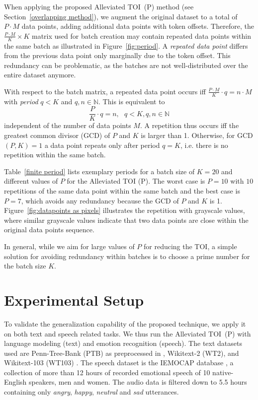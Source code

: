 \documentclass[11pt,a4paper]{article}
\begin{document}
When applying the proposed Alleviated TOI~(P) method (see Section~\ref{overlapping method}), we augment the original dataset to a total of $P \cdot M$ data points, adding additional data points with token offsets. Therefore, the $\frac{P \cdot M}{K} \times K$ matrix used for batch creation may contain repeated data points within the same batch as illustrated in Figure~\ref{fig:period}. A \textit{repeated data point} differs from the previous data point only marginally due to the token offset. This redundancy can be problematic, as the batches are not well-distributed over the entire dataset anymore.

With respect to the batch matrix, a repeated data point occurs iff $\frac{P \cdot M}{K} \cdot q = n \cdot M$ with \textit{period} $q < K$ and $q,n \in \mathbb{N}$. This is equivalent to
\[\frac{P}{K} \cdot q = n,\ \ \ q < K, q,n \in \mathbb{N}\]
independent of the number of data points $M$. A repetition thus occurs iff the greatest common divisor (GCD) of $P$ and $K$ is larger than 1. Otherwise, for GCD$(P,K) = 1$ a data point repeats only after period $q=K$, i.e. there is no repetition within the same batch.

Table~\ref{finite period} lists exemplary periods for a batch size of $K=20$ and different values of $P$ for the Alleviated TOI (P). The worst case is $P=10$ with $10$ repetitions of the same data point within the same batch and the best case is $P=7$, which avoids any redundancy because the GCD of $P$ and $K$ is 1. Figure~\ref{fig:datapoints as pixels} illustrates the repetition with grayscale values, where similar grayscale values indicate that two data points are close within the original data points sequence.

In general, while we aim for large values of $P$ for reducing the TOI, a simple solution for avoiding redundancy within batches is to choose a prime number for the batch size $K$.

\section{Experimental Setup}
\label{sec-exp}
To validate the generalization capability of the proposed technique, we apply it on both text and speech related tasks. We thus run the Alleviated TOI~(P) with language modeling (text) and emotion recognition (speech). The text datasets used are Penn-Tree-Bank (PTB) \cite{Marcus:1993} as preprocessed in \citet{Mikolov:11}, Wikitext-2 (WT2), and Wikitext-103 (WT103) \cite{Merity:16}.
The speech dataset is the IEMOCAP database \cite{Busso2008IEMOCAPIE}, a collection of more than 12 hours of recorded emotional speech of 10 native-English speakers, men and women. The audio data is filtered down to 5.5 hours containing only \textit{angry}, \textit{happy}, \textit{neutral} and \textit{sad} utterances.
\end{document}

